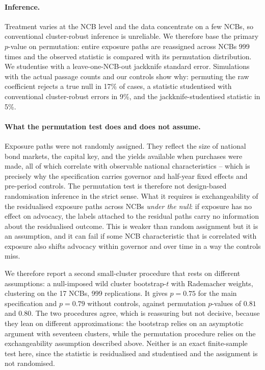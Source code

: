 \documentclass[11pt]{article}
\theoremstyle{plain}
\begin{document}
\paragraph{Inference.}
Treatment varies at the NCB level and the data concentrate on a few NCBs, so conventional cluster-robust inference is unreliable. We therefore base the primary $p$-value on permutation: entire exposure paths are reassigned across NCBs 999 times and the observed statistic is compared with its permutation distribution. We studentise with a leave-one-NCB-out jackknife standard error. Simulations with the actual passage counts and our controls show why: permuting the raw coefficient rejects a true null in 17\% of cases, a statistic studentised with conventional cluster-robust errors in 9\%, and the jackknife-studentised statistic in 5\%.

\paragraph{What the permutation test does and does not assume.}
Exposure paths were not randomly assigned. They reflect the size of national bond markets, the capital key, and the yields available when purchases were made, all of which correlate with observable national characteristics -- which is precisely why the specification carries governor and half-year fixed effects and pre-period controls. The permutation test is therefore not design-based randomisation inference in the strict sense. What it requires is exchangeability of the residualised exposure paths across NCBs \emph{under the null}: if exposure has no effect on advocacy, the labels attached to the residual paths carry no information about the residualised outcome. This is weaker than random assignment but it is an assumption, and it can fail if some NCB characteristic that is correlated with exposure also shifts advocacy within governor and over time in a way the controls miss.

We therefore report a second small-cluster procedure that rests on different assumptions: a null-imposed wild cluster bootstrap-$t$ with Rademacher weights, clustering on the 17 NCBs, 999 replications. It gives $p = 0.75$ for the main specification and $p = 0.79$ without controls, against permutation $p$-values of $0.81$ and $0.80$. The two procedures agree, which is reassuring but not decisive, because they lean on different approximations: the bootstrap relies on an asymptotic argument with seventeen clusters, while the permutation procedure relies on the exchangeability assumption described above. Neither is an exact finite-sample test here, since the statistic is residualised and studentised and the assignment is not randomised.
\end{document}
